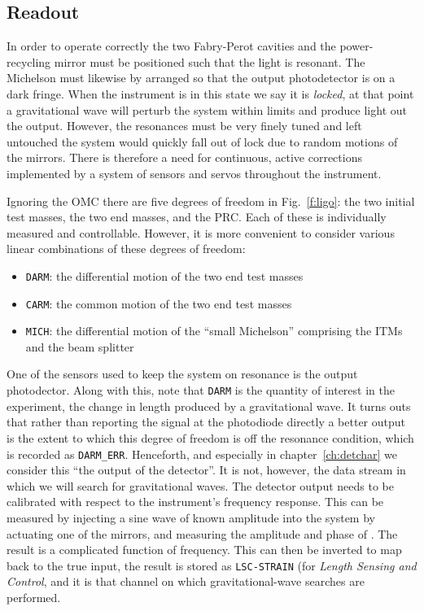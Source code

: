 \subsection{Readout}
\label{ssec:readout}

In order to operate correctly the two Fabry-Perot cavities and the
power-recycling mirror must be positioned such that the light is
resonant.  The Michelson must likewise by arranged so that the output
photodetector is on a dark fringe.  When the instrument is in this
state we say it is \emph{locked}, at that point a gravitational wave
will perturb the system within limits and produce light out the
output.  However, the resonances must be very finely tuned and left
untouched the system would quickly fall out of lock due to random
motions of the mirrors.  There is therefore a need for continuous,
active corrections implemented by a system of sensors and servos
throughout the instrument.

Ignoring the OMC there are five degrees of freedom in
Fig.~\ref{f:ligo}: the two initial test masses, the two end masses,
and the PRC.  Each of these is individually measured and controllable.
However, it is more convenient to consider various linear combinations
of these degrees of freedom:

\begin{itemize}
\item \texttt{DARM}: the differential motion of the two end test masses
\item \texttt{CARM}: the common motion of the two end test masses
\item \texttt{MICH}: the differential motion of the ``small Michelson'' comprising
the ITMs and the beam splitter
\end{itemize}

One of the sensors used to keep the system on resonance is the output
photodector.  Along with this, note that \texttt{DARM} is the quantity
of interest in the experiment, the change in length produced by a
gravitational wave.    It turns outs that rather than reporting the
signal at the photodiode directly a better output is the extent to
which this degree of freedom is off the resonance condition, which is
recorded as \texttt{DARM\_ERR}.  Henceforth, and especially in
chapter~\ref{ch:detchar} we consider this ``the output of the
detector''.  It is not, however, the data stream in which we will
search for gravitational waves.  The detector output needs to be
calibrated with respect to the instrument's frequency response.  This
can be measured by injecting a sine wave of known amplitude into the
system by actuating one of the mirrors, and measuring the amplitude
and phase of \darmerr.  The result is a complicated function of
frequency.  This can then be inverted to map \darmerr back to the true
input, the result is stored as \texttt{LSC-STRAIN} (for \emph{Length
Sensing and Control}, and it is that channel on which
gravitational-wave searches are performed.


